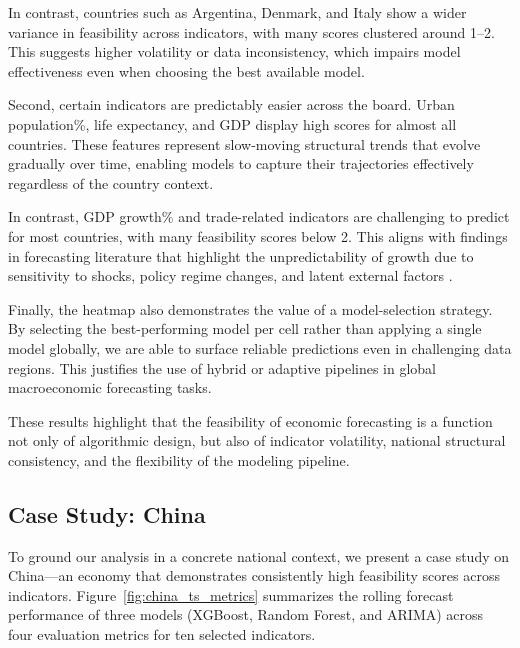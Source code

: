 \documentclass[12pt]{article}
\begin{document}
In contrast, countries such as Argentina, Denmark, and Italy show a wider variance in feasibility across indicators, with many scores clustered around 1–2. This suggests higher volatility or data inconsistency, which impairs model effectiveness even when choosing the best available model.

Second, certain indicators are predictably easier across the board. Urban population\%, life expectancy, and GDP display high scores for almost all countries. These features represent slow-moving structural trends that evolve gradually over time, enabling models to capture their trajectories effectively regardless of the country context.

In contrast, GDP growth\% and trade-related indicators are challenging to predict for most countries, with many feasibility scores below 2. This aligns with findings in forecasting literature that highlight the unpredictability of growth due to sensitivity to shocks, policy regime changes, and latent external factors \cite{Loungani2001, ClementsHendry2002}.

Finally, the heatmap also demonstrates the value of a model-selection strategy. By selecting the best-performing model per cell rather than applying a single model globally, we are able to surface reliable predictions even in challenging data regions. This justifies the use of hybrid or adaptive pipelines in global macroeconomic forecasting tasks.

These results highlight that the feasibility of economic forecasting is a function not only of algorithmic design, but also of indicator volatility, national structural consistency, and the flexibility of the modeling pipeline.
\subsection{Case Study: China}

To ground our analysis in a concrete national context, we present a case study on China—an economy that demonstrates consistently high feasibility scores across indicators. Figure~\ref{fig:china_ts_metrics} summarizes the rolling forecast performance of three models (XGBoost, Random Forest, and ARIMA) across four evaluation metrics for ten selected indicators.
\end{document}
